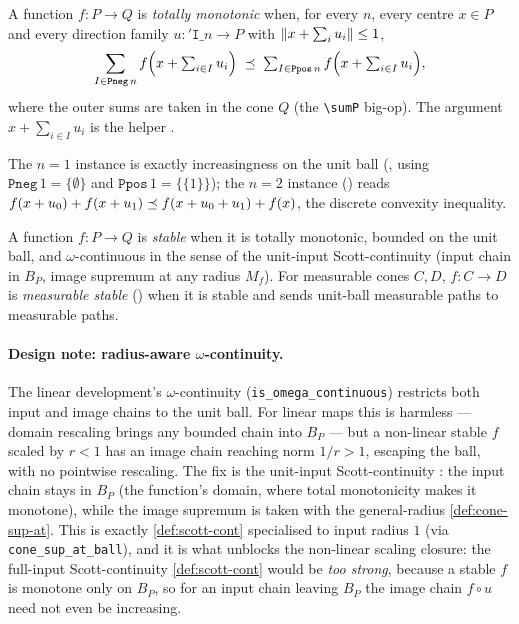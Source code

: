 \begin{definition}
\label{def:is-totmono}
\rocqok{}
A function $f : P \to Q$ is \emph{totally monotonic} when, for every
$n$, every centre $x \in P$ and every direction family
$u : \mathtt{'I}\_n \to P$ with $\lVert x + \sum_i u_i \rVert \leq 1$,
\[
  \sum_{I \in \texttt{Pneg}\,n} f\Bigl(x + \textstyle\sum_{i \in I} u_i\Bigr)
  \;\preceq\;
  \sum_{I \in \texttt{Ppos}\,n} f\Bigl(x + \textstyle\sum_{i \in I} u_i\Bigr),
\]
where the outer sums are taken in the cone $Q$ (the \texttt{\textbackslash sumP} big-op).
The argument $x + \sum_{i \in I} u_i$ is the helper
.
\end{definition}

The $n = 1$ instance is exactly increasingness on the unit ball
(, using
$\texttt{Pneg}\,1 = \{\emptyset\}$ and $\texttt{Ppos}\,1 = \{\{1\}\}$);
the $n = 2$ instance () reads
$f(x + u_0) + f(x + u_1) \preceq f(x + u_0 + u_1) + f(x)$, the discrete
convexity inequality.

\begin{definition}
\label{def:is-stable}
\rocqok{}
A function $f : P \to Q$ is \emph{stable} when it is totally monotonic,
bounded on the unit ball, and $\omega$-continuous in the sense of the
unit-input Scott-continuity
 (input chain in
$B_P$, image supremum at any radius $M_f$). For measurable cones $C, D$,
$f : C \to D$ is \emph{measurable stable}
() when it is stable and
sends unit-ball measurable paths to measurable paths.
\end{definition}

\paragraph{Design note: radius-aware \texorpdfstring{$\omega$}{omega}-continuity.}
The linear development's $\omega$-continuity
(\texttt{is\_omega\_continuous}) restricts both input and image chains
to the unit ball. For linear maps this is harmless --- domain rescaling
brings any bounded chain into $B_P$ --- but a non-linear stable $f$
scaled by $r < 1$ has an image chain reaching norm $1/r > 1$, escaping
the ball, with no pointwise rescaling. The fix is the unit-input
Scott-continuity
: the input chain
stays in $B_P$ (the function's domain, where total monotonicity makes it
monotone), while the image supremum is taken with the general-radius
\autoref{def:cone-sup-at}. This is exactly
\autoref{def:scott-cont} specialised to input radius $1$ (via
\texttt{cone\_sup\_at\_ball}), and it is what unblocks the non-linear
scaling closure: the full-input Scott-continuity
\autoref{def:scott-cont} would be \emph{too strong}, because a stable
$f$ is monotone only on $B_P$, so for an input chain leaving $B_P$ the
image chain $f \circ u$ need not even be increasing.

